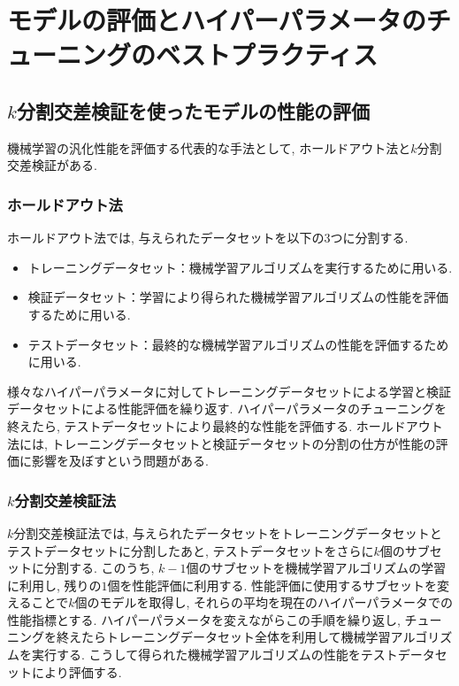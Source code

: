 \documentclass[uplatex]{jsarticle}
\theoremstyle{definition}
\numberwithin{equation}{section}
\begin{document}
\section{モデルの評価とハイパーパラメータのチューニングのベストプラクティス}
\subsection{$k$分割交差検証を使ったモデルの性能の評価}
機械学習の汎化性能を評価する代表的な手法として, ホールドアウト法と$k$分割交差検証がある.

\subsubsection{ホールドアウト法}
ホールドアウト法では, 与えられたデータセットを以下の3つに分割する.
\begin{itemize}
    \item
    トレーニングデータセット：機械学習アルゴリズムを実行するために用いる.

    \item
    検証データセット：学習により得られた機械学習アルゴリズムの性能を評価するために用いる.

    \item
    テストデータセット：最終的な機械学習アルゴリズムの性能を評価するために用いる.
\end{itemize}
様々なハイパーパラメータに対してトレーニングデータセットによる学習と検証データセットによる性能評価を繰り返す.
ハイパーパラメータのチューニングを終えたら, テストデータセットにより最終的な性能を評価する.
ホールドアウト法には, トレーニングデータセットと検証データセットの分割の仕方が性能の評価に影響を及ぼすという問題がある.

\subsubsection{$k$分割交差検証法}
$k$分割交差検証法では, 与えられたデータセットをトレーニングデータセットとテストデータセットに分割したあと, テストデータセットをさらに$k$個のサブセットに分割する.
このうち, $k - 1$個のサブセットを機械学習アルゴリズムの学習に利用し, 残りの$1$個を性能評価に利用する.
性能評価に使用するサブセットを変えることで$k$個のモデルを取得し, それらの平均を現在のハイパーパラメータでの性能指標とする.
ハイパーパラメータを変えながらこの手順を繰り返し, チューニングを終えたらトレーニングデータセット全体を利用して機械学習アルゴリズムを実行する.
こうして得られた機械学習アルゴリズムの性能をテストデータセットにより評価する.
\end{document}
